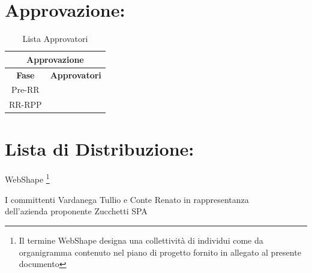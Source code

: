 \section*{\LARGE Approvazione:}
\begin{table}[!h]
	\begin{center}
		\begin{tabular}
			{|c|c|}
			\hline
			\multicolumn{2}{|c|}{ \textbf{Approvazione} } \\
			\hline
			\textbf{Fase} & \textbf{Approvatori} \\
			\hline
			\multirow{2}{*}{Pre-RR} &  \\
									&  \\
			\hline
			\multirow{2}{*}{RR-RPP} & \\
									& \\
			\hline
		\end{tabular}
		\caption{Lista Approvatori} %
		\label{tabapprovazione}
	\end{center}
\end{table}
\textbf{}

\section*{\LARGE Lista di Distribuzione:}

	\begin{elenconumerato}{\normindent}
		\item WebShape \footnote{Il termine WebShape designa una collettivit\`a di individui come da organigramma contenuto nel piano di progetto fornito in allegato al presente documento}
		\item I committenti Vardanega Tullio e Conte Renato in rappresentanza \\  dell'azienda proponente Zucchetti SPA
	\end{elenconumerato}

